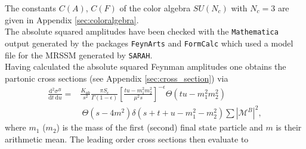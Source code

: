 The constants $C(A)$, $C(F)$ of the color algebra $SU(N_c)$ with $N_c = 3$ are given in Appendix \ref{sec:coloralgebra}.\\
The absolute squared amplitudes have been checked with the \texttt{Mathematica} output generated by the packages  \texttt{FeynArts} \cite{Hahn:2000} and \texttt{FormCalc} \cite{ChokoufeNejad:2013qja, Hahn:1998yk} which used a model file for the MRSSM generated by \texttt{SARAH}\cite{Staub:2013tta, Staub:2012pb, Staub:2010jh, Staub:2009bi}.\\ 
Having calculated the absolute squared Feynman amplitudes one obtains the partonic cross sections (see Appendix \ref{sec:cross_section}) via
\begin{align}
\frac{\mbox{d}^2 \sigma^B}{\mbox{d}t\ \mbox{d}u} =& \frac{K_{ab}}{s^2} \frac{\pi S_{\epsilon}}{\Gamma(1-\epsilon)} \left[ \frac{tu-m_1^2m_2^2}{\mu^2 s}\right]^{-\epsilon} \Theta(tu-m_1^2m_2^2)\nonumber\\
&\ \Theta(s-4m^2) \delta(s+t+u-m_1^2-m_2^2) \sum |\mathcal{M}^B|^2,\label{eq:sigma_tree}
\end{align}
where $m_1$ ($m_2$) is the mass of the first (second) final state particle and $m$ is their arithmetic mean. The leading order cross sections then evaluate to
